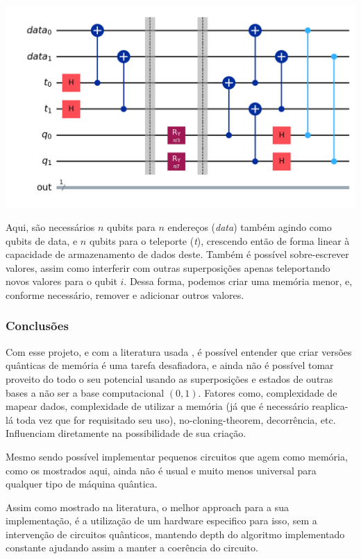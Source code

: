 \documentclass{article}
\begin{document}
 \begin{center}
 	\includegraphics[scale=0.4]{qram.png}
 	\label{fig:qram}
 \end{center}

Aqui, são necessários $n$ qubits para $n$ endereços (\emph{data}) também agindo como qubits de data, e $n$ qubits para o teleporte (\emph{t}), crescendo então de forma linear à capacidade de armazenamento de dados deste. 
Também é possível sobre-escrever valores, assim como interferir com outras superposições apenas teleportando novos valores para o qubit $i$. Dessa forma, podemos criar uma memória menor, e, conforme necessário, remover e adicionar outros valores.

\subsubsection{Conclusões}

Com esse projeto, e com a literatura usada \cite{jaques2023qram}\cite{Giovannetti_2008}, é possível entender que criar versões quânticas de memória é uma tarefa desafiadora, e ainda não é possível tomar proveito do todo o seu potencial usando as superposições e estados de outras bases a não ser a base computacional $({0,1})$. Fatores como, complexidade de mapear dados, complexidade de utilizar a memória (já que é necessário reaplica-lá toda vez que for requisitado seu uso), no-cloning-theorem, decorrência, etc. Influenciam diretamente na possibilidade de sua criação.

Mesmo sendo possível implementar pequenos circuitos que agem como memória, como os mostrados aqui, ainda não é usual e muito menos universal para qualquer tipo de máquina quântica.

Assim como mostrado na literatura, o melhor approach para a sua implementação, é a utilização de um hardware especifico para isso, sem a intervenção de circuitos quânticos, mantendo depth do algoritmo implementado constante ajudando assim a manter a coerência do circuito. 
\end{document}
